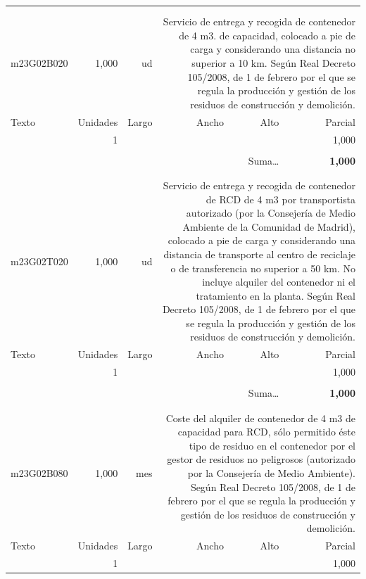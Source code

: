 \documentclass{book}%
\begin{document}
\begin{longtable}{lrrrrr}
\hline%
&&&&&\\%
&&&&&\\%
m23G02B020&     1,000& ud&\multicolumn{3}{p{6cm}}{\scriptsize Servicio de entrega y recogida de contenedor de 4 m3. de capacidad, colocado a pie de carga y considerando una distancia no superior a 10 km. Según Real Decreto 105/2008, de 1 de febrero por el que se regula la producción y gestión de los residuos de construcción y demolición.\normalsize}\\%
Texto&Unidades&Largo&Ancho&Alto&Parcial\\%
\hline%
\multicolumn{1}{p{3.5cm}}{ }&1&&&&     1,000\\%
&&&&&\\%
\multicolumn{5}{r}{Suma\ldots}&\textbf{     1,000}\\%
\hline%
&&&&&\\%
&&&&&\\%
m23G02T020&     1,000& ud&\multicolumn{3}{p{6cm}}{\scriptsize Servicio de entrega y recogida de contenedor de RCD de 4 m3 por transportista autorizado (por la Consejería de Medio Ambiente de la Comunidad de Madrid), colocado a pie de carga y considerando una distancia de transporte al centro de reciclaje o de transferencia no superior a 50 km. No incluye alquiler del contenedor ni el tratamiento en la planta. Según Real Decreto 105/2008, de 1 de febrero por el que se regula la producción y gestión de los residuos de construcción y demolición.\normalsize}\\%
Texto&Unidades&Largo&Ancho&Alto&Parcial\\%
\hline%
\multicolumn{1}{p{3.5cm}}{ }&1&&&&     1,000\\%
&&&&&\\%
\multicolumn{5}{r}{Suma\ldots}&\textbf{     1,000}\\%
\hline%
&&&&&\\%
&&&&&\\%
m23G02B080&     1,000& mes&\multicolumn{3}{p{6cm}}{\scriptsize Coste del alquiler de contenedor de 4 m3 de capacidad para RCD, sólo permitido éste tipo de residuo en el contenedor por el gestor de residuos no peligrosos (autorizado por la Consejería de Medio Ambiente). Según Real Decreto 105/2008, de 1 de febrero por el que se regula la producción y gestión de los residuos de construcción y demolición.\normalsize}\\%
Texto&Unidades&Largo&Ancho&Alto&Parcial\\%
\hline%
\multicolumn{1}{p{3.5cm}}{ }&1&&&&     1,000\\%

\end{longtable}
\end{document}
